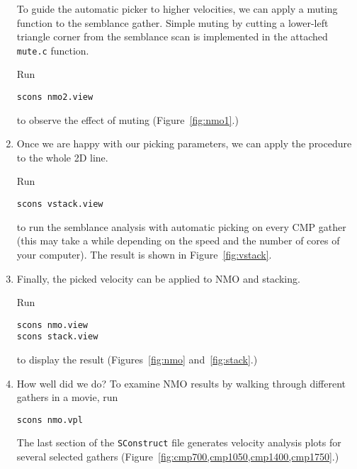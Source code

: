 \begin{enumerate}
\answer{%
}

To guide the automatic picker to higher velocities, we can apply a
muting function to the semblance gather. Simple muting by cutting a
lower-left triangle corner from the semblance scan is implemented in
the attached \texttt{mute.c} function.

Run
\begin{verbatim}
scons nmo2.view
\end{verbatim}
to observe the effect of muting (Figure~\ref{fig:nmo1}.)


\item Once we are happy with our picking parameters, we can apply the procedure to the whole 2D line. 

Run
\begin{verbatim}
scons vstack.view
\end{verbatim}
to run the semblance analysis with automatic picking on every CMP
gather (this may take a while depending on the speed and the number of
cores of your computer). The result is shown in Figure~\ref{fig:vstack}.


\item Finally, the picked velocity can be applied to NMO and stacking.         

Run
\begin{verbatim}
scons nmo.view
scons stack.view
\end{verbatim}
to display the result (Figures~\ref{fig:nmo} and~\ref{fig:stack}.) 



\item How well did we do? To examine NMO results by walking through different gathers in a movie, run
\begin{verbatim}
scons nmo.vpl
\end{verbatim}

The last section of the \texttt{SConstruct} file generates velocity
analysis plots for several selected gathers (Figure~\ref{fig:cmp700,cmp1050,cmp1400,cmp1750}.)


\end{enumerate}
